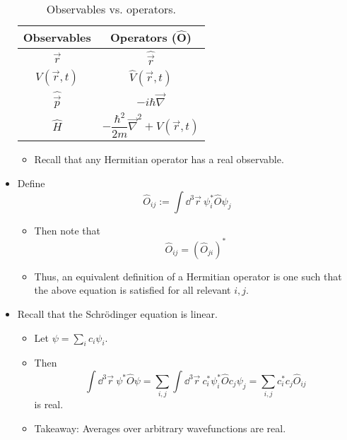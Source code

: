 \documentclass[../notes.tex]{subfiles}
\begin{document}
\begin{itemize}
    \begin{table}[H]
        \centering
        \small
        \renewcommand{\arraystretch}{1.4}
        \begin{tabular}{c|c}
            \textbf{Observables} & \textbf{Operators ($\bm{\hat{O}}$)}\\
            \hline
            $\vec{r}$ & $\hat{\vec{r}}$\\
            $V(\vec{r},t)$ & $\hat{V}(\vec{r},t)$\\
            $\hat{\vec{p}}$ & $-i\hbar\vec{\nabla}$\\
            $\hat{H}$ & $-\dfrac{\hbar^2}{2m}\vec{\nabla}^2+V(\vec{r},t)$\\
        \end{tabular}
        \caption{Observables vs. operators.}
        \label{tab:observablesOperators}
    \end{table}
    \begin{itemize}
        \item Recall that any Hermitian operator has a real observable.
    \end{itemize}
    \item Define
    \begin{equation*}
        \hat{O}_{ij} := \int\dd^3\vec{r}\ \psi_i^*\hat{O}\psi_j
    \end{equation*}
    \begin{itemize}
        \item Then note that
        \begin{equation*}
            \hat{O}_{ij} = (\hat{O}_{ji})^*
        \end{equation*}
        \item Thus, an equivalent definition of a Hermitian operator is one such that the above equation is satisfied for all relevant $i,j$.
    \end{itemize}
    \item Recall that the Schr\"{o}dinger equation is linear.
    \begin{itemize}
        \item Let $\psi=\sum_ic_i\psi_i$.
        \item Then
        \begin{equation*}
            \int\dd^3\vec{r}\ \psi^*\hat{O}\psi = \sum_{i,j}\int\dd^3\vec{r}\ c_i^*\psi_i^*\hat{O}c_j\psi_j
            = \sum_{i,j}c_i^*c_j\hat{O}_{ij}
        \end{equation*}
        is real.
        \item Takeaway: Averages over arbitrary wavefunctions are real.

\end{itemize}
\end{itemize}
\end{document}
